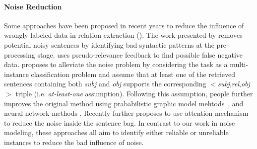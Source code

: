 \paragraph{Noise Reduction}
Some approaches have been proposed in recent years to reduce the influence of wrongly labeled data in relation extraction (\RE).
The work presented by \cite{takamatsu2012reducing} removes potential noisy sentences by identifying bad syntactic
patterns at the pre-processing stage. \cite{xu2013filling} uses pseudo-relevance feedback to find
possible false negative data. \cite{riedel2010modeling} proposes to alleviate the noise problem by considering the \RE task
as a multi-instance classification problem and assume
that at least one of the retrieved sentences containing both \emph{subj} and \emph{obj} supports the corresponding $<$\emph{subj},\emph{rel},\emph{obj}$>$ triple (i.e. \emph{at-least-one} assumption).
Following this assumption, people further improves the original method using prababilistic graphic model mehtods~\cite{hoffmann2011knowledge,surdeanu2012multi}, and neural network methods \cite{zeng2015distant}. Recently \cite{lin2016neural} further proposes to use attention mechanism to reduce the noise inside the sentence bag. 
In contrast to our work in noise modeling, these approaches all aim to identify either reliable or unreliable instances to reduce
the bad influence of noise.

%


